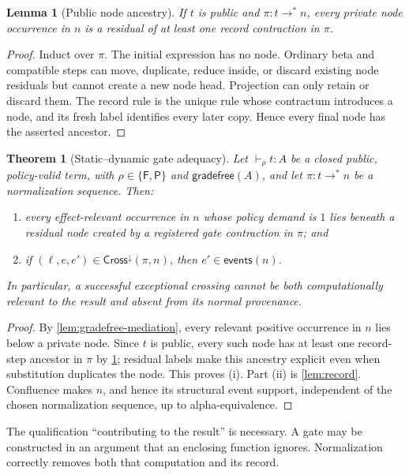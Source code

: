 \documentclass[11pt]{article}
\numberwithin{equation}{section}
\theoremstyle{definition}
\theoremstyle{plain}
\newtheorem{theorem}[definition]{Theorem}
\newtheorem{lemma}[definition]{Lemma}
\theoremstyle{remark}
\newcommand{\Frm}{\mathsf F}
\newcommand{\Prs}{\mathsf P}
\newcommand{\events}{\mathsf{events}}
\newcommand{\cross}{\mathsf{Cross}}
\begin{document}
\begin{lemma}[Public node ancestry]\label{lem:node-ancestry}
If \(t\) is public and \(\pi:t\longrightarrow^*n\), every private node
occurrence in \(n\) is a residual of at least one record contraction in
\(\pi\).
\end{lemma}

\begin{proof}
Induct over \(\pi\).  The initial expression has no node.  Ordinary beta and
compatible steps can move, duplicate, reduce inside, or discard existing node
residuals but cannot create a new node head.  Projection can only retain or
discard them.  The record rule is the unique rule whose contractum introduces
a node, and its fresh label identifies every later copy.  Hence every final
node has the asserted ancestor.
\end{proof}

\begin{theorem}[Static--dynamic gate adequacy]\label{thm:adequacy}
Let \(\vdash_{\rho}t:A\) be a closed public, policy-valid term, with
\(\rho\in\{\Frm,\Prs\}\) and \(\mathsf{gradefree}(A)\), and let
\(\pi:t\longrightarrow^*n\) be a normalization sequence.  Then:
\begin{enumerate}[label=(\roman*),leftmargin=2.5em]
\item every effect-relevant occurrence in \(n\) whose policy demand is \(1\)
lies beneath a residual node created by a registered gate contraction in
\(\pi\); and
\item if \((\ell,e,e')\in\cross^\downarrow(\pi,n)\), then
\(e'\in\events(n)\).
\end{enumerate}
In particular, a successful exceptional crossing cannot be both
computationally relevant to the result and absent from its normal provenance.
\end{theorem}

\begin{proof}
By \cref{lem:gradefree-mediation}, every relevant positive occurrence in
\(n\) lies below a private node.  Since \(t\) is public, every such node has at
least one record-step ancestor in \(\pi\) by
\cref{lem:node-ancestry}; residual labels make this ancestry explicit even
when substitution duplicates the node.  This proves (i).
Part (ii) is \cref{lem:record}.  Confluence makes \(n\), and hence its
structural event support, independent of the chosen normalization sequence,
up to alpha-equivalence.
\end{proof}

The qualification ``contributing to the result'' is necessary.  A gate may be
constructed in an argument that an enclosing function ignores.  Normalization
correctly removes both that computation and its record.
\end{document}
